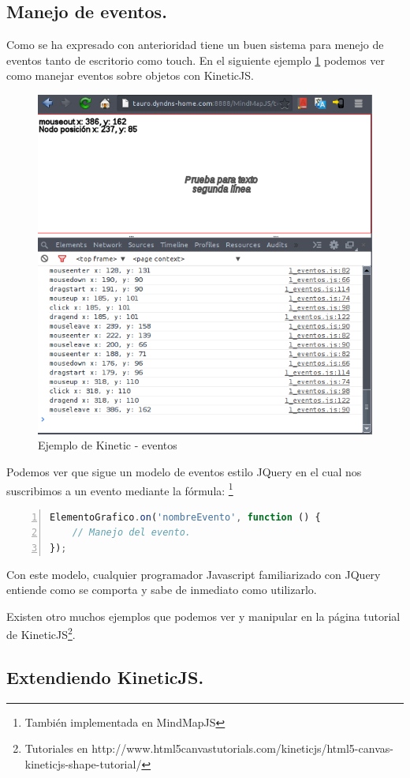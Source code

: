 \subsection{Manejo de eventos.}
Como se ha expresado con anterioridad tiene un buen sistema para menejo de eventos tanto de escritorio como touch. En el siguiente ejemplo \ref{fig:kinetic-ejemplo-eventos} podemos ver como manejar eventos sobre objetos con KineticJS.

\begin{figure}[tbph]
\centering
\includegraphics[width=0.6\linewidth]{imagenes/KineticjsEjemplo1.png}
\caption{Ejemplo de Kinetic - eventos}
\label{fig:kinetic-ejemplo-eventos}
\end{figure}



Podemos ver que sigue un modelo de eventos estilo JQuery en el cual nos suscribimos a un evento mediante la fórmula: \footnote{También implementada en MindMapJS} 
\begin{lstlisting}[language=JavaScript, numbers=left]
ElementoGrafico.on('nombreEvento', function () { 
	// Manejo del evento.
});
\end{lstlisting}

Con este modelo, cualquier programador Javascript familiarizado con JQuery entiende como se comporta y sabe de inmediato como utilizarlo.  

Existen otro muchos ejemplos que podemos ver y manipular en la página tutorial de KineticJS\footnote{Tutoriales en http://www.html5canvastutorials.com/kineticjs/html5-canvas-kineticjs-shape-tutorial/}. 

\subsection{Extendiendo KineticJS.}


